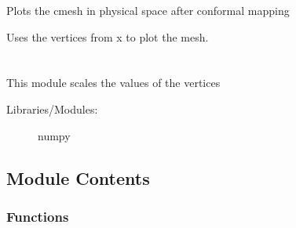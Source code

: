 \documentclass[letterpaper,10pt,english]{sphinxmanual}
\begin{document}
\begin{fulllineitems}
\label{\detokenize{autoapi/plot_mesh_func/index:plot_mesh_func.plot_mesh}}
\sphinxAtStartPar
Plots the c\sphinxhyphen{}mesh in physical space after conformal mapping

\sphinxAtStartPar
Uses the vertices from x to plot the mesh.

\end{fulllineitems}



\section{}
\label{\detokenize{autoapi/sangho_func/index:module-sangho_func}}\label{\detokenize{autoapi/sangho_func/index:sangho-func}}\label{\detokenize{autoapi/sangho_func/index::doc}}
\sphinxAtStartPar
This module scales the values of the vertices
\begin{description}
\item[{Libraries/Modules:}] \leavevmode
\sphinxAtStartPar
numpy

\end{description}


\subsection{Module Contents}
\label{\detokenize{autoapi/sangho_func/index:module-contents}}

\subsubsection{Functions}
\label{\detokenize{autoapi/sangho_func/index:functions}}
\end{document}
